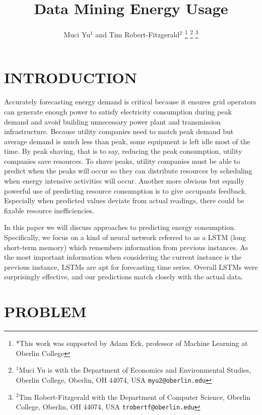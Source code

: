 \documentclass[letterpaper, 11 pt, conference]{ieeeconf}  %
\title{\LARGE \bf
Data Mining Energy Usage
}
\author{Muci Yu$^{1}$ and Tim Robert-Fitzgerald$^{2}$%
\thanks{*This work was supported by Adam Eck, professor of Machine Learning at Oberlin College}%
\thanks{$^{1}$Muci Yu is with the Department of Economics and Environmental Studies, Oberlin College, Oberlin, OH 44074, USA
        {\tt\small myu2@oberlin.edu}}%
\thanks{$^{2}$Tim Robert-Fitzgerald with the Department of Computer Science, Oberlin College, Oberlin, OH 44074, USA
        {\tt\small trobertf@oberlin.edu}}%
}
\begin{document}
\maketitle
\thispagestyle{empty}
\pagestyle{empty}


\section{INTRODUCTION}

Accurately forecasting energy demand is critical because it ensures grid operators can generate enough power to satisfy electricity consumption during peak demand and avoid building unnecessary power plant and transmission infrastructure. Because utility companies need to match peak demand but average demand is much less than peak, some equipment is left idle most of the time. By peak shaving, that is to say, reducing the peak consumption, utility companies save resources. To shave peaks, utility companies must be able to predict when the peaks will occur so they can distribute resources by scheduling when energy intensive activities will occur. Another more obvious but equally powerful use of predicting resource consumption is to give occupants feedback. Especially when predicted values deviate from actual readings, there could be fixable resource inefficiencies.

In this paper we will discuss approaches to predicting energy consumption. Specifically, we focus on a kind of neural network referred to as a LSTM (long short-term memory) which remembers information from previous instances. As the most important information when considering the current instance is the previous instance, LSTMs are apt for forecasting time series. Overall LSTMs were surprisingly effective, and our predictions match closely with the actual data.


\section{PROBLEM}
\end{document}
